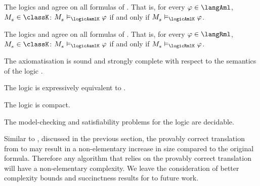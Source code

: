 \begin{corollary}
The logics \logicAamlKFF{} and \logicAmlKFF{} agree on all formulas of \langAml{}.
That is, for every $\phi \in \langAml$, $\kPModel{\kStateS} \in \classK$: $\kPModel{\kStateS} \entails_\logicAamlK \phi$ if and only if $\kPModel{\kStateS} \entails_\logicAmlK \phi$.
\end{corollary}

\begin{corollary}
The logics \logicAamlKFF{} and \logicRmlKFF{} agree on all formulas of \langRml{}.
That is, for every $\phi \in \langRml$, $\kPModel{\kStateS} \in \classK$: $\kPModel{\kStateS} \entails_\logicAamlK \phi$ if and only if $\kPModel{\kStateS} \entails_\logicRmlK \phi$.
\end{corollary}

\begin{corollary}
The axiomatisation \axiomRamlKFF{} is sound and strongly complete with respect to the semantics of the logic \logicAamlKFF{}.
\end{corollary}

\begin{corollary}
The logic \logicAamlKFF{} is expressively equivalent to \logicKFF{}.
\end{corollary}

\begin{corollary}
The logic \logicAamlKFF{} is compact.
\end{corollary}

\begin{corollary}
The model-checking and satisfiability problems for the logic \logicAamlKFF{} are decidable.
\end{corollary}

Similar to \logicAamlK{}, discussed in the previous section, the provably correct translation from \langAaml{} to \langMl{} may result in a non-elementary increase in size compared to the original formula.
Therefore any algorithm that relies on the provably correct translation will have a non-elementary complexity.
We leave the consideration of better complexity bounds and succinctness results for \logicAamlKFF{} to future work.


